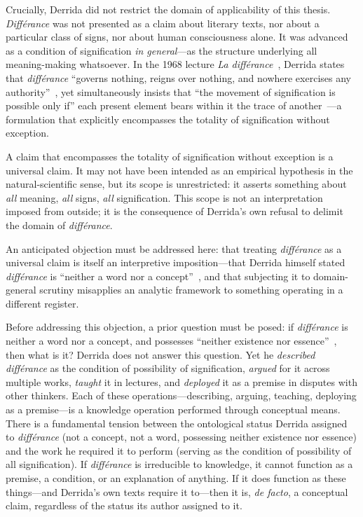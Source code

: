 \documentclass[a4paper,twocolumn,11pt]{article}
\begin{document}
Crucially, Derrida did not restrict the domain of applicability of this thesis. \emph{Diff\'erance} was not presented as a claim about literary texts, nor about a particular class of signs, nor about human consciousness alone. It was advanced as a condition of signification \emph{in general}---as the structure underlying all meaning-making whatsoever. In the 1968 lecture \emph{La diff\'erance}~\cite{Derrida1968}, Derrida states that \emph{diff\'erance} ``governs nothing, reigns over nothing, and nowhere exercises any authority''~\cite[p.~22]{Derrida1982margins}, yet simultaneously insists that ``the movement of signification is possible only if'' each present element bears within it the trace of another~\cite[p.~13]{Derrida1982margins}---a formulation that explicitly encompasses the totality of signification without exception.

A claim that encompasses the totality of signification without exception is a universal claim. It may not have been intended as an empirical hypothesis in the natural-scientific sense, but its scope is unrestricted: it asserts something about \emph{all} meaning, \emph{all} signs, \emph{all} signification. This scope is not an interpretation imposed from outside; it is the consequence of Derrida's own refusal to delimit the domain of \emph{diff\'erance}.

An anticipated objection must be addressed here: that treating \emph{diff\'erance} as a universal claim is itself an interpretive imposition---that Derrida himself stated \emph{diff\'erance} is ``neither a word nor a concept''~\cite[p.~3]{Derrida1982margins}, and that subjecting it to domain-general scrutiny misapplies an analytic framework to something operating in a different register.

Before addressing this objection, a prior question must be posed: if \emph{diff\'erance} is neither a word nor a concept, and possesses ``neither existence nor essence''~\cite[p.~6]{Derrida1982margins}, then what is it? Derrida does not answer this question. Yet he \emph{described} \emph{diff\'erance} as the condition of possibility of signification, \emph{argued} for it across multiple works, \emph{taught} it in lectures, and \emph{deployed} it as a premise in disputes with other thinkers. Each of these operations---describing, arguing, teaching, deploying as a premise---is a knowledge operation performed through conceptual means. There is a fundamental tension between the ontological status Derrida assigned to \emph{diff\'erance} (not a concept, not a word, possessing neither existence nor essence) and the work he required it to perform (serving as the condition of possibility of all signification). If \emph{diff\'erance} is irreducible to knowledge, it cannot function as a premise, a condition, or an explanation of anything. If it does function as these things---and Derrida's own texts require it to---then it is, \emph{de facto}, a conceptual claim, regardless of the status its author assigned to it.
\end{document}
